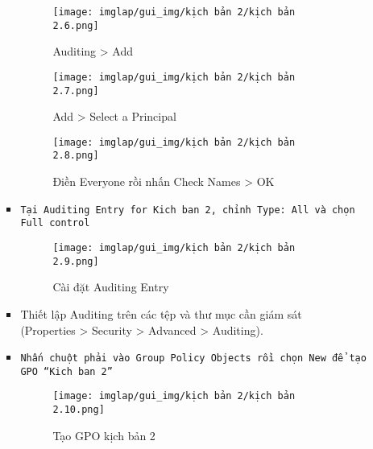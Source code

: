 \documentclass[13pt]{article}
\begin{document}
\begin{enumerate}
\begin{itemize}
\begin{itemize}
                \begin{figure}[H]
                    \centering
                    \texttt{[image: imglap/gui\_img/kịch bản 2/kịch bản 2.6.png]}
                    \caption{Auditing > Add}
                    \label{fig:enter-label}
                \end{figure}

                \begin{figure}[H]
                    \centering
                    \texttt{[image: imglap/gui\_img/kịch bản 2/kịch bản 2.7.png]}
                    \caption{Add > Select a Principal}
                    \label{fig:enter-label}
                \end{figure}

                \begin{figure}[H]
                    \centering
                    \texttt{[image: imglap/gui\_img/kịch bản 2/kịch bản 2.8.png]}
                    \caption{Điền Everyone rồi nhấn Check Names > OK}
                    \label{fig:enter-label}
                \end{figure}

                \item \texttt{Tại Auditing Entry for Kich ban 2, chỉnh Type: All và chọn Full control}
                \begin{figure}[H]
                    \centering
                    \texttt{[image: imglap/gui\_img/kịch bản 2/kịch bản 2.9.png]}
                    \caption{Cài đặt Auditing Entry}
                    \label{fig:enter-label}
                \end{figure}
                
                \item Thiết lập Auditing trên các tệp và thư mục cần giám sát \\(Properties > Security > Advanced > Auditing). 

                \item \texttt{Nhấn chuột phải vào Group Policy Objects rồi chọn New để tạo GPO “Kich ban 2”}
                \begin{figure}[H]
                    \centering
                    \texttt{[image: imglap/gui\_img/kịch bản 2/kịch bản 2.10.png]}
                    \caption{Tạo GPO kịch bản 2}
                    \label{fig:enter-label}
                \end{figure}
    

\end{itemize}
\end{itemize}
\end{enumerate}
\end{document}
